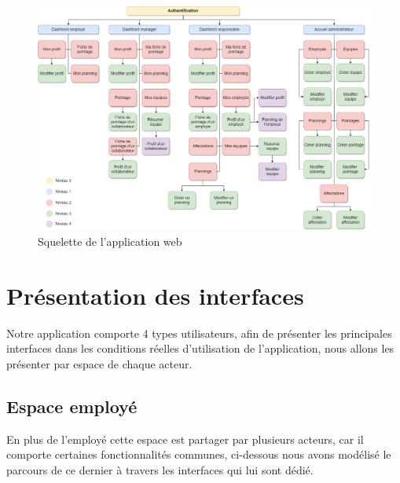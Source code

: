 \clearpage
\thispagestyle{empty}
\begin{landscape}
    \begin{figure}[h!]
        \centering
        \includegraphics[scale=0.44 ]{images/interface/arbre.png}
        \caption{Squelette de l'application web}
        \label{fig90}
    \end{figure}  
\end{landscape}

\clearpage

\section{Présentation des interfaces}
Notre application comporte 4 types utilisateurs, afin de présenter les principales interfaces dans
les conditions réelles d’utilisation de l’application, nous allons les présenter par espace de chaque
acteur.
\vspace{-20pt}
\subsection{Espace employé}
En plus de l’employé cette espace est partager par plusieurs acteurs, car il comporte certaines
fonctionnalités communes, ci-dessous nous avons modélisé le parcours de ce dernier à travers les
interfaces qui lui sont dédié.

